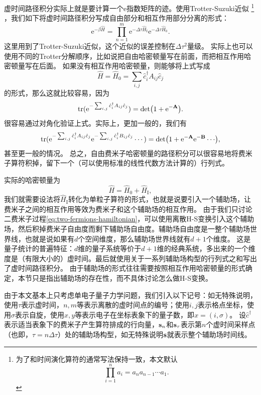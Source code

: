 \documentclass[hyperref, UTF8, a4paper]{ctexart}
\newcommand*{\ee}{\mathrm{e}}
\begin{document}
虚时间路径积分实际上就是要计算一个$\ee$指数矩阵的迹。使用Trotter-Suzuki近似%
\footnote{为了和时间演化算符的通常写法保持一致，本文默认
\[
    \prod_{i=1}^n a_i = a_n a_{n-1} \cdots a_1.
\]
}%
，我们如下将虚时间路径积分写成自由部分和相互作用部分分离的形式：
\[
    \ee^{-\beta \hat{H}} = \prod_{n=1}^{m} \ee^{-\Delta \tau \hat{H}_\text{I}} \ee^{-\Delta \tau \hat{H}_0}.
\]
这里用到了Trotter-Suzuki近似，这个近似的误差控制在$\Delta \tau^2$量级。%
实际上也可以使用不同的Trotter分解顺序，比如说把自由哈密顿量写在前面，而把相互作用哈密顿量写在后面。
如果没有相互作用哈密顿量，则能够将上式写成
\[
    \hat{H} = \hat{H}_0 = \sum_{i, j} \hat{c}_i^\dagger A_{ij} \hat{c}_j
\]
的形式，那么这就比较容易，因为
\begin{equation}
    \trace(\ee^{- \sum_{i, j} \hat{c}_i^\dagger A_{ij} \hat{c}_j}) = \det(1 + \ee^{- \vb{A}}).
\end{equation}
很容易通过对角化验证上式。实际上，更加一般的，我们有
\begin{equation}
    \trace(\ee^{- \sum_{i, j} \hat{c}_i^\dagger A_{ij} \hat{c}_j} \ee^{- \sum_{i, j} \hat{c}_i^\dagger B_{ij} \hat{c}_j} \cdots) = \det(1 + \ee^{- \vb{A}}\ee^{- \vb{B}} \cdots),
    \label{eq:trace-to-det}
\end{equation}
甚至更一般的情况。
总之，自由费米子哈密顿量的路径积分可以很容易地将费米子算符积掉，留下一个（可以使用标准的线性代数方法计算的）行列式。

实际的哈密顿量为
\[
    \hat{H} = \hat{H}_0 + \hat{H}_\text{I}, 
\]
我们就需要设法将$\hat{H}_\text{I}$转化为单粒子算符的形式，也就是说要引入一个辅助场，让费米子之间的相互作用等效为费米子和这个辅助场的相互作用。
由于我们只讨论二费米子过程\eqref{eq:two-fermions-hamiltonian}，可以使用离散H-S变换引入这个辅助场，然后积掉费米子自由度而剩下辅助场自由度。辅助场自由度是一整个辅助场世界线，也就是说如果有$d$个空间维度，那么辅助场世界线就有$d+1$个维度。
这是量子统计的普遍特征：$d$维的量子系统等价于$d+1$维的经典系统，多出来的一个维度是（有限大小的）虚时间。最后就使用关于一系列辅助场构型的行列式之和写出了虚时间路径积分。
由于辅助场的形式往往需要按照相互作用哈密顿量的形式确定，本节只是指出辅助场的存在性，而不具体讨论怎么做H-S变换。

由于本文基本上只考虑单电子量子力学问题，我们引入以下记号：如无特殊说明，使用$\tau$表示虚时间，$n, m$等表示离散的虚时间点的编号；使用$i, j$表示格点坐标，使用$\sigma$表示自旋，使用$x, y$等表示电子在坐标表象下的量子数，即$x=(i, \sigma)$。
设$\hat{c}^\dagger$表示适当表象下的费米子产生算符排成的行向量，$\vb{s}_n$和$\vb{s}_\tau$表示第$n$个虚时间采样点（也即，$\tau=n\Delta \tau$）处的辅助场构型，如无特殊说明$\vb{s}$就表示整个辅助场时间线。
\end{document}

